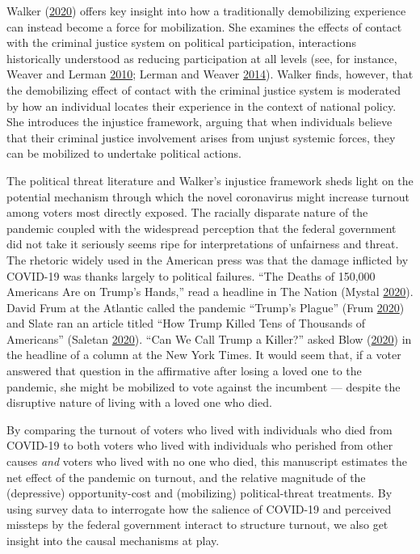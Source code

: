 \documentclass[
  12pt,
]{article}
\begin{document}
Walker (\protect\hyperlink{ref-Walker2020}{2020}) offers key insight into how a traditionally demobilizing experience can instead become a force for mobilization. She examines the effects of contact with the criminal justice system on political participation, interactions historically understood as reducing participation at all levels (see, for instance, Weaver and Lerman \protect\hyperlink{ref-Weaver2010}{2010}; Lerman and Weaver \protect\hyperlink{ref-Lerman2014}{2014}). Walker finds, however, that the demobilizing effect of contact with the criminal justice system is moderated by how an individual locates their experience in the context of national policy. She introduces the injustice framework, arguing that when individuals believe that their criminal justice involvement arises from unjust systemic forces, they can be mobilized to undertake political actions.

The political threat literature and Walker's injustice framework sheds light on the potential mechanism through which the novel coronavirus might increase turnout among voters most directly exposed. The racially disparate nature of the pandemic coupled with the widespread perception that the federal government did not take it seriously seems ripe for interpretations of unfairness and threat. The rhetoric widely used in the American press was that the damage inflicted by COVID-19 was thanks largely to political failures. ``The Deaths of 150,000 Americans Are on Trump's Hands,'' read a headline in The Nation (Mystal \protect\hyperlink{ref-Mystal2020}{2020}). David Frum at the Atlantic called the pandemic ``Trump's Plague'' (Frum \protect\hyperlink{ref-Frum2020}{2020}) and Slate ran an article titled ``How Trump Killed Tens of Thousands of Americans'' (Saletan \protect\hyperlink{ref-Saletan2020}{2020}). ``Can We Call Trump a Killer?'' asked Blow (\protect\hyperlink{ref-Blow2020}{2020}) in the headline of a column at the New York Times. It would seem that, if a voter answered that question in the affirmative after losing a loved one to the pandemic, she might be mobilized to vote against the incumbent --- despite the disruptive nature of living with a loved one who died.

By comparing the turnout of voters who lived with individuals who died from COVID-19 to both voters who lived with individuals who perished from other causes \emph{and} voters who lived with no one who died, this manuscript estimates the net effect of the pandemic on turnout, and the relative magnitude of the (depressive) opportunity-cost and (mobilizing) political-threat treatments. By using survey data to interrogate how the salience of COVID-19 and perceived missteps by the federal government interact to structure turnout, we also get insight into the causal mechanisms at play.
\end{document}
